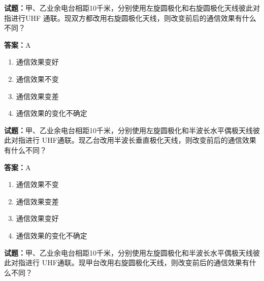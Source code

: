 \documentclass{ctexbook}
\begin{document}




\vspace{1em}

\textbf{试题：}甲、乙业余电台相距10千米，分别使用左旋圆极化和右旋圆极化天线彼此对指进行UHF
通联。现双方都改用右旋圆极化天线，则改变前后的通信效果有什么不同？ 

\textbf{答案：}A 

\begin{enumerate}[leftmargin=3em]
  \item 通信效果变好 

  \item 通信效果不变 

  \item 通信效果变差 

  \item 通信效果的变化不确定 

\end{enumerate}





\vspace{1em}

\textbf{试题：}甲、乙业余电台相距10千米，分别使用左旋圆极化和半波长水平偶极天线彼此对指进行
UHF通联。现乙台改用半波长垂直极化天线，则改变前后的通信效果有什么不同？ 

\textbf{答案：}A 

\begin{enumerate}[leftmargin=3em]
  \item 通信效果不变 


  \item 通信效果变差 

  \item 通信效果变好 

  \item 通信效果的变化不确定 

\end{enumerate}





\vspace{1em}

\textbf{试题：}甲、乙业余电台相距10千米，分别使用左旋圆极化和半波长水平偶极天线彼此对指进行
UHF通联。现甲台改用右旋圆极化天线，则改变前后的通信效果有什么不同？ 
\end{document}
